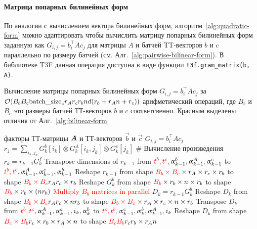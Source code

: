 \paragraph{Матрица попарных билинейных форм}
По аналогии с вычислением вектора билинейных форм, алгоритм~\ref{alg:quadratic-form} можно адаптировать чтобы  вычислить матрицу попарных билинейных форм заданную как $G_{i,j} = b_i^\intercal A c_j$ для матрицы $A$ и батчей TT-векторов $b$ и $c$ параллельно по размеру батчей (см. Алг.~\ref{alg:pairwise-bilinear-form}). В библиотеке T3F данная операция доступна в виде функции \texttt{t3f.gram\_matrix(b, A)}.

\begin{algorithm}[tb]
   \caption{Вычисление матрицы попарных билинейных форм $G_{i,j} = b_i^\intercal A c_j$ за $\compl(B_b B_c \text{batch\_size}_c r_A r_c r_b n d (r_b + r_A n + r_c))$ арифметический операций, где $B_b$ и $B_c$ это размеры батчей ТТ-векторов $b$ и $c$ соответсвенно. Красным выделены отличия от Алг.~\ref{alg:bilinear-form}}
   \label{alg:pairwise-bilinear-form}
\begin{algorithmic}[1]
   \REQUIRE факторы ТТ-матрицы $\mat{A}$ и ТТ-векторов $\vec{b}$ и $\vec{c}$
   \ENSURE $G_{i,j} = b_i^\intercal A c_j$
   \STATE $r_1 = \sum_{i_k, j_k} G_k^b[i_k] \otimes G_k^A[i_k, j_k] \otimes G_k^c[j_k]$
   \STATE \# Вычисление произведения $r_k = r_{k-1}G_k^f$
   \STATE Transpose dimensions of $r_{k-1}$ from $\textcolor{red}{t^b, t^c}, \alpha_{k-1}^b,\alpha_{k-1}^A, \alpha_{k-1}^c$ to $\textcolor{red}{t^b, t^c}, \alpha_{k-1}^A, \alpha_{k-1}^c,\alpha_{k-1}^b$
   \STATE Reshape $r_{k-1}$ from shape $\textcolor{red}{B_b \times B_c} \times r_A \times r_c \times r_b$ to shape $\textcolor{red}{B_b \times B_c} r_A  r_c \times r_b$
   \STATE Reshape $G_k^b$ from shape $\textcolor{red}{B_b} \times r_b \times n \times r_b$ to shape $\textcolor{red}{B_b} \times r_b \times (n r_b)$
   \STATE \textcolor{red}{Multiply $B_b$ matrices in parallel} $D_k = r_{k-1} G_k^b$ 
   \STATE Reshape $D_k$ from shape $\textcolor{red}{B_b \times B_c} r_A r_c \times n r_b$ to shape $\textcolor{red}{B_b \times B_c} \times r_A \times r_c \times n \times r_b$
   \STATE Transpose $D_k$ from $\textcolor{red}{t^b, t^c}, \alpha_{k-1}^A, \alpha_{k-1}^c,i_k,\alpha_{k}^b$ to $\textcolor{red}{t^c, t^b},\alpha_{k-1}^c,\alpha_{k}^b,\alpha_{k-1}^A,i_k$
   \STATE Reshape $D_k$ from shape $\textcolor{red}{B_c \times B_b} r_c \times r_b \times r_A \times n$ to shape $\textcolor{red}{B_c B_b} r_c r_b \times r_A n$

\end{algorithmic}
\end{algorithm}
